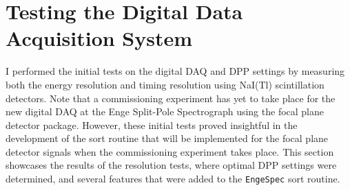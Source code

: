 








\section{Testing the Digital Data Acquisition System} \label{sec:DAQ_Tests}

I performed the initial tests on the digital DAQ and DPP settings by measuring both the energy resolution and timing resolution using NaI(Tl) scintillation detectors. Note that a commissioning experiment has yet to take place for the new digital DAQ at the Enge Split-Pole Spectrograph using the focal plane detector package. However, these initial tests proved insightful in the development of the sort routine that will be implemented for the focal plane detector signals when the commissioning experiment takes place. This section showcases the results of the resolution tests, where optimal DPP settings were determined, and several features that were added to the \texttt{EngeSpec} sort routine.

